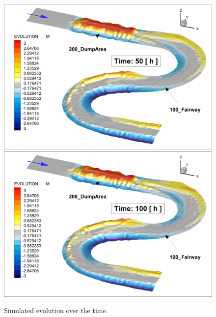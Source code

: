 \begin{figure} [!h]
	\centering
	\includegraphics[scale=0.14]{../img/critDig_Poly_050h.png}
	\includegraphics[scale=0.14]{../img/critDig_Poly_100h.png}
	\caption{Simulated evolution over the time.}\label{result34}
\end{figure}

